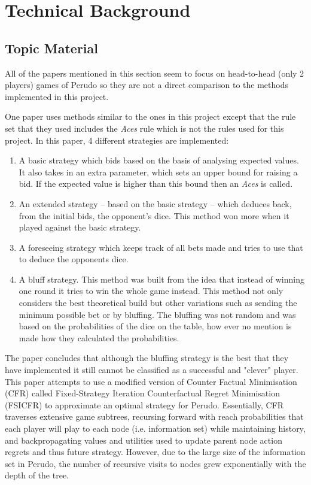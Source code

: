 \chapter{Technical Background}

\section{Topic Material}

All of the papers mentioned in this section seem to focus on head-to-head (only 2 players) games of Perudo so they are not a direct comparison to the methods implemented in this project.


One paper \autocite{Boros2014} uses methods similar to the ones in this project except that the rule set that they used includes the \textit{Aces} rule which is not the rules used for this project. In this paper, 4 different strategies are implemented:
\begin{enumerate}
    \item A basic strategy which bids based on the basis of analysing expected values. It also takes in an extra parameter, which sets an upper bound for raising a bid. If the expected value is higher than this bound then an \textit{Aces} is called.
    \item An extended strategy -- based on the basic strategy -- which deduces back, from the initial bids, the opponent's dice. This method won more when it played against the basic strategy.
    \item A foreseeing strategy which keeps track of all bets made and tries to use that to deduce the opponents dice.
    \item A bluff strategy. This method was built from the idea that instead of winning one round it tries to win the whole game instead. This method not only considers the best theoretical build but other variations such as sending the minimum possible bet or by bluffing. The bluffing was not random and was based on the probabilities of the dice on the table, how ever no mention is made how they calculated the probabilities.
\end{enumerate}
The paper concludes that although the bluffing strategy is the best that they have implemented it still cannot be classified as a successful and "clever" player.\\

This paper \autocite{Neller2012} attempts to use a modified version of Counter Factual Minimisation (CFR) called Fixed-Strategy Iteration Counterfactual Regret Minimisation (FSICFR) to approximate an  optimal strategy for Perudo. Essentially, CFR traverses extensive game subtrees, recursing forward with reach probabilities that each player will play to each node (i.e. information set) while maintaining history, and backpropagating values and utilities used to update parent node action regrets and thus future strategy. However, due to the large size of the information set in Perudo, the number of recursive visits to nodes grew exponentially with the depth of the tree.

